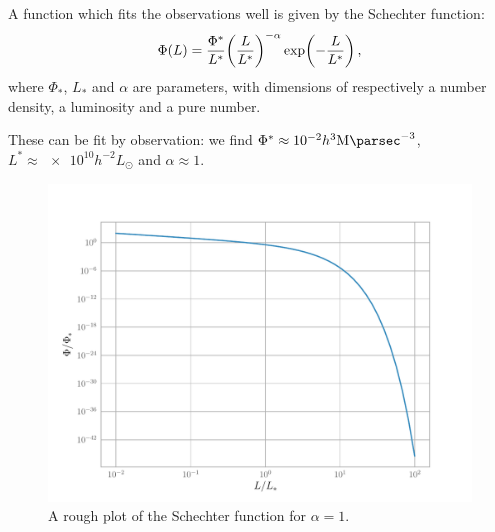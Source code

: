 \documentclass[main.tex]{subfiles}
\begin{document}





A function which fits the observations well is given by the Schechter function:
%
\begin{equation}
  \Phi(L) = \frac{\Phi^*}{L^*} \qty(\frac{L}{L^*})^{-\alpha} \exp(-\frac{L}{L^*})
  \,,
\end{equation}
%
where \(\Phi_{*}\), \(L_{*}\) and \(\alpha \) are parameters, with dimensions of respectively a number density, a luminosity and a pure number.

These can be fit by observation: we find \(\Phi^* \approx \SI{e-2}{} h^3 \SI{}{\mega\parsec^{-3}}\), \(L^* \approx \num{e10}h^{-2} L_\odot \) and \(\alpha \approx 1\).

\begin{figure}[H]
\centering
\includegraphics[width=\textwidth]{figures/Schechter.pdf}
\caption{A rough plot of the Schechter function for \(\alpha = 1\).}
\label{fig:Schechter}
\end{figure}
\end{document}
